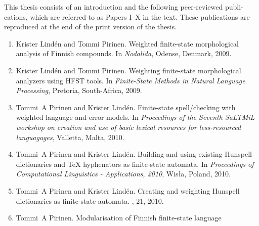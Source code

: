 \documentclass[officiallayout]{unihelcompling}
\begin{document}
This thesis consists of an introduction and the following peer-reviewed publi-
cations, which are referred to as Papers I–X in the text. These publications
are reproduced at the end of the print version of the thesis.


\begin{enumerate}
    \item[\citetalias{pirinen2009weighted}]
        Krister Lindén and Tommi Pirinen.
        \newblock Weighted finite-state morphological analysis of Finnish 
        compounds.
        \newblock In \emph{Nodalida}, Odense, Denmark, 2009.
    \item[\citetalias{pirinen2009weighting}]
        Krister Lindén and Tommi Pirinen.
        \newblock Weighting finite-state morphological analyzers using HFST
        tools.
        \newblock In \emph{Finite-State Methods in Natural Language Processing},
        Pretoria, South-Africa, 2009.
    \item[\citetalias{pirinen2010finitestate}]
        Tommi~A Pirinen and Krister Lindén.
        \newblock Finite-state spell\-/checking with weighted language and error
        models.
        \newblock In {\em Proceedings of the Seventh SaLTMiL workshop on 
            creation and use of basic lexical resources for less-resourced 
        languagages}, Valletta, Malta, 2010.
    \item[\citetalias{pirinen2010building}]
        Tommi~A Pirinen and Krister Lindén.
        \newblock Building and using existing Hunspell dictionaries and {\TeX }
        hyphenators as finite-state automata.
        \newblock In {\em Proccedings of Computational Linguistics -
            Applications, 2010}, Wis{\l}a, Poland, 2010.
    \item[\citetalias{pirinen2010creating}]
        Tommi~A Pirinen and Krister Lindén.
        \newblock Creating and weighting Hunspell dictionaries as finite-state
        automata.
        , 21, 2010.
    \item[\citetalias{pirinen2011modularisation}]
        Tommi~A Pirinen.
        \newblock Modularisation of Finnish finite-state language 

\end{enumerate}
\end{document}
